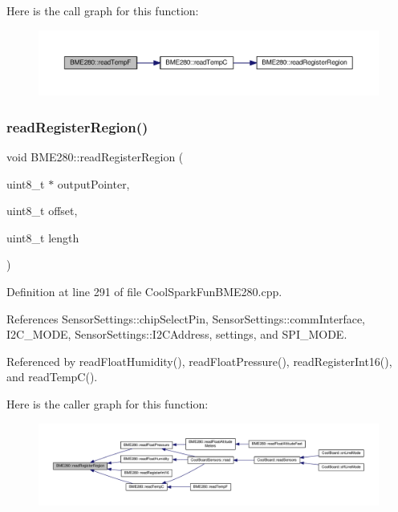 Here is the call graph for this function\+:
\nopagebreak
\begin{figure}[H]
\begin{center}
\leavevmode
\includegraphics[width=350pt]{df/dcf/class_b_m_e280_a9648b496f6b4700550782a715a98b3c7_cgraph}
\end{center}
\end{figure}
\mbox{\label{class_b_m_e280_aecca87c2c40a7f2bcabcea921bdc6124}} 
\subsubsection{\texorpdfstring{read\+Register\+Region()}{readRegisterRegion()}}
{\footnotesize\ttfamily void B\+M\+E280\+::read\+Register\+Region (\begin{DoxyParamCaption}\item[{uint8\+\_\+t $\ast$}]{output\+Pointer,  }\item[{uint8\+\_\+t}]{offset,  }\item[{uint8\+\_\+t}]{length }\end{DoxyParamCaption})}



Definition at line 291 of file Cool\+Spark\+Fun\+B\+M\+E280.\+cpp.



References Sensor\+Settings\+::chip\+Select\+Pin, Sensor\+Settings\+::comm\+Interface, I2\+C\+\_\+\+M\+O\+DE, Sensor\+Settings\+::\+I2\+C\+Address, settings, and S\+P\+I\+\_\+\+M\+O\+DE.



Referenced by read\+Float\+Humidity(), read\+Float\+Pressure(), read\+Register\+Int16(), and read\+Temp\+C().

Here is the caller graph for this function\+:
\nopagebreak
\begin{figure}[H]
\begin{center}
\leavevmode
\includegraphics[width=350pt]{df/dcf/class_b_m_e280_aecca87c2c40a7f2bcabcea921bdc6124_icgraph}
\end{center}
\end{figure}
\mbox{\label{class_b_m_e280_a1bbd14c8591966df531e40085342ff71}} 
